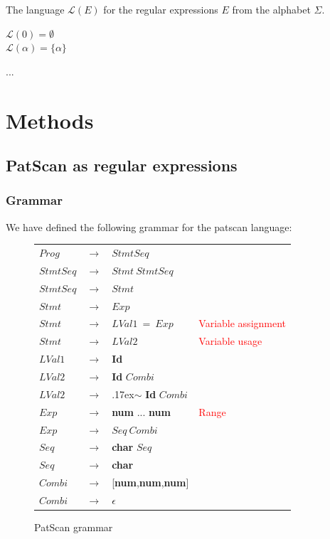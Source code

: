 \documentclass[12pt]{article}
\theoremstyle{definition}
\begin{document}
\begin{definition} The language $\mathcal{L}(E)$ for the regular expressions $E$ from the alphabet $\Sigma$.

	$\mathcal{L}(0) = \emptyset$\\
	$\mathcal{L}(\alpha) = \{\alpha\}$
\end{definition}

... 

\newpage

\section{Methods}
\subsection{PatScan as regular expressions}

\subsubsection{Grammar}
\label{Patscan grammar}

We have defined the following grammar for the patscan language:

\begin{figure}[H]
\begin{center}
\begin{tabular}{|lcll|}
	\hline
	$Prog$ & $\rightarrow$ & $StmtSeq$ & \\
	$StmtSeq$ & $\rightarrow$ & $Stmt\ StmtSeq$ & \\
	$StmtSeq$ & $\rightarrow$ & $Stmt$ & \\
	$Stmt$ & $\rightarrow$ & $Exp$ & \\
	$Stmt$ & $\rightarrow$ & $LVal1\ =\ Exp$ &  \textcolor{red}{Variable assignment} \\
	$Stmt$ & $\rightarrow$ & $LVal2$ & \textcolor{red}{Variable usage} \\
	$LVal1$ & $\rightarrow$ & \textbf{Id} & \\
	$LVal2$ & $\rightarrow$ & \textbf{Id} $Combi$ & \\
	$LVal2$ & $\rightarrow$ & {\raise.17ex\hbox{$\scriptstyle\mathtt{\sim}$}} \textbf{Id} $Combi$ & \\
	$Exp$ & $\rightarrow$ & \textbf{num} ... \textbf{num} & \textcolor{red}{Range} \\
	$Exp$ & $\rightarrow$ & $Seq\ Combi$ & \\
	$Seq$ & $\rightarrow$ & \textbf{char} $Seq$ & \\
	$Seq$ & $\rightarrow$ & \textbf{char} & \\
	$Combi$ & $\rightarrow$ & [\textbf{num},\textbf{num},\textbf{num}] & \\
	$Combi$ & $\rightarrow$ & $\epsilon$ & \\
	\hline
\end{tabular}
\end{center}
\caption{PatScan grammar}
\end{figure}
\end{document}
